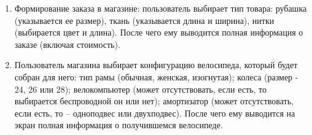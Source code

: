 \documentclass[12pt]{article}
\begin{document}
\begin{enumerate}
\item Формирование заказа в магазине: пользователь выбирает тип товара: рубашка (указывается ее размер), 
ткань (указывается длина и ширина), нитки (выбирается цвет и длина). После чего ему выводится полная информация
о заказе (включая стоимость).
\item Пользователь магазина выбирает конфигурацию велосипеда, который будет собран для него: тип рамы 
(обычная, женская, изогнутая); колеса (размер - 24, 26 или 28); велокомпьютер (может отсутствовать, если есть, то
выбирается беспроводной он или нет); амортизатор (может отсутствовать, если есть, то -- одноподвес или двухподвес). 
После чего ему выводится на экран полная информация о получившемся велосипеде.
\end{enumerate}
\end{document}
